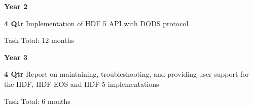 \documentclass[12pt]{article}
\begin{document}
\begin{description}
 \item{\large \bf Year 2}
   \begin{description}

   \item{\bf 4 Qtr} Implementation of HDF 5 API with DODS protocol

 Task Total: 12 months

   \end{description}
 \item{\large \bf Year 3}
   \begin{description}

   \item{\bf 4 Qtr} Report on maintaining, troubleshooting, and providing
     user support for the HDF, HDF-EOS and HDF 5 implementations

Task Total: 6 months

   \end{description}

\end{description}
\end{document}
